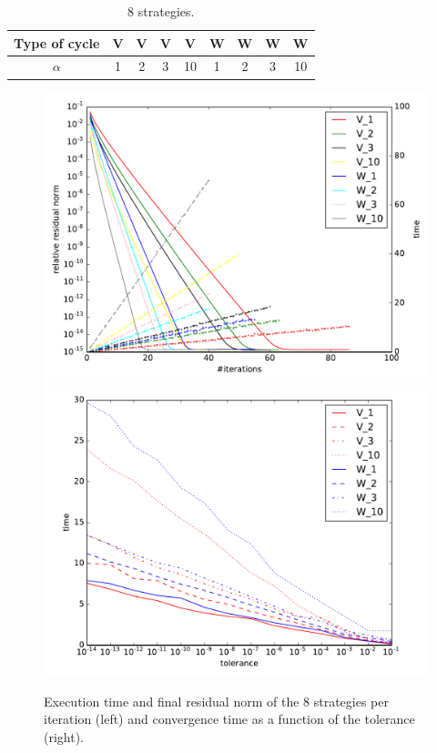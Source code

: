 \begin{table}

\begin{center}
 \begin{tabular}{|c|c|c|c|c|c|c|c|c|}
   \hline
   Type of cycle & V & V & V & V & W & W & W & W \\
   \hline
   $\alpha$ & 1 & 2 & 3 & 10 & 1 & 2 & 3 & 10 \\
   \hline
 \end{tabular}
\end{center}
 \caption{8 strategies.}
 \label{table.strat1}

\end{table}


\begin{figure}
  \includegraphics[width=0.49\linewidth]{figs/convergence_1.pdf}
  \includegraphics[width=0.49\linewidth]{figs/time_convergence.pdf}
  \caption{Execution time and final residual norm of the 8 strategies per iteration (left) and convergence time as a function of the tolerance (right).}
  \label{fig.first_tests}
\end{figure}


